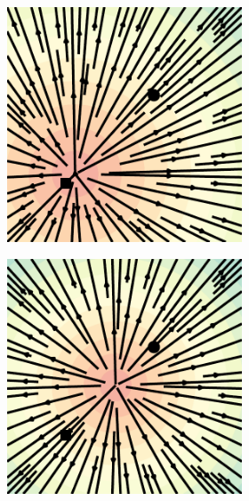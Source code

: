 \documentclass{article}
\begin{document}
\begin{figure}
\begin{subfigure}[t]{0.42\linewidth}
\begin{subfigure}[t]{0.23\linewidth}
        \vspace{-1.5em}
        \caption*{}
    \end{subfigure}
    \begin{subfigure}[t]{0.23\linewidth}
        \centering
        \includegraphics[width=\linewidth]{figures/plots/2d_vf_score_dif_1.pdf}
        \vspace{-1.5em}
        \caption*{}
    \end{subfigure}
    \begin{subfigure}[t]{0.23\linewidth}
        \centering
        \includegraphics[width=\linewidth]{figures/plots/2d_vf_score_dif_2.pdf}

\end{subfigure}
\end{subfigure}
\end{figure}
\end{document}
